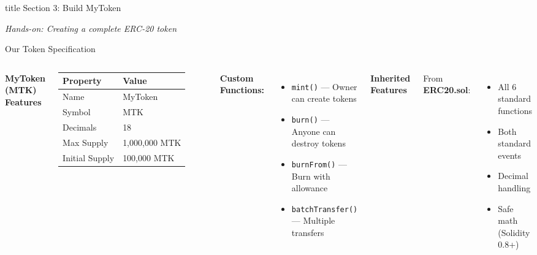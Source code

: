 \documentclass[8pt,aspectratio=169]{beamer}
\begin{document}
\begin{frame}[t]
\vfill
\centering
\begin{beamercolorbox}[sep=8pt,center]{title}
\Large Section 3: Build MyToken\par
\end{beamercolorbox}
\begin{center}
\textit{Hands-on: Creating a complete ERC-20 token}
\end{center}
\vfill
\end{frame}

\begin{frame}[t]{Our Token Specification}
\begin{columns}[T]
\textbf{MyToken (MTK) Features}

\begin{tabular}{ll}
\toprule
\textbf{Property} & \textbf{Value} \\
\midrule
Name & MyToken \\
Symbol & MTK \\
Decimals & 18 \\
Max Supply & 1,000,000 MTK \\
Initial Supply & 100,000 MTK \\
\bottomrule
\end{tabular}

\vspace{0.5em}
\textbf{Custom Functions:}
\begin{itemize}
\item \texttt{mint()} --- Owner can create tokens
\item \texttt{burn()} --- Anyone can destroy tokens
\item \texttt{burnFrom()} --- Burn with allowance
\item \texttt{batchTransfer()} --- Multiple transfers
\end{itemize}

\textbf{Inherited Features}

From \textbf{ERC20.sol}:
\begin{itemize}
\item All 6 standard functions
\item Both standard events
\item Decimal handling
\item Safe math (Solidity 0.8+)
\end{itemize}


\end{columns}
\end{frame}
\end{document}
